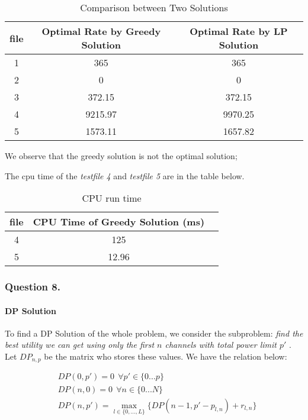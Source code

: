 \documentclass[11pt, oneside]{report}
\begin{document}
\begin{table}[!htbp]
\centering
\begin{tabular}{|c|c|c|}%
\hline
file & Optimal Rate by Greedy Solution & Optimal Rate by LP Solution  \\
\hline
1 & 365 & 365\\
\hline
2 & 0 & 0\\
\hline
3 & 372.15 & 372.15\\
\hline
4 & 9215.97 & 9970.25\\
\hline
5 & 1573.11 & 1657.82\\
\hline
\end{tabular}
\caption{Comparison between Two Solutions}
\end{table}

We observe that the greedy solution is not the optimal solution;

The cpu time of the \textit{testfile 4} and \textit{testfile 5} are in the table below.

\begin{table}[!htbp]
\centering
\begin{tabular}{|c|c|c|}%
\hline
file & CPU Time of Greedy Solution (ms)  \\
\hline
4 & 125\\
\hline
5 & 12.96\\
\hline
\end{tabular}
\caption{CPU run time}
\end{table}

\subsubsection{Question 8. }
\paragraph{DP Solution} To find a DP Solution of the whole problem, we consider the subproblem: \textit{find the best utility we can get using only the first $n$ channels with total power limit $p'$ }. Let $DP_{n,p}$ be the matrix who stores these values. We have the relation below:

\begin{align*}
&DP(0,p') = 0 \ \  \forall p'\in \{0...p\} \\
&DP(n,0) = 0\ \ \forall n\in \{0...N\} \\
&DP(n,p') =  \max_{l \in \{0,...,L\}} \{ DP(n-1, p'-p_{l,n}) + r_{l,n} \}
\end{align*}
\end{document}
